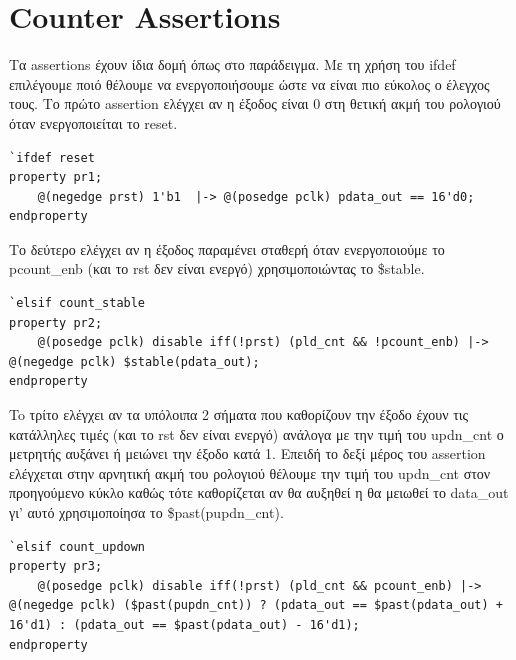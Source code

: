 \documentclass[12pt]{article}
\begin{document}
\section*{Counter Assertions}
Τα assertions έχουν ίδια δομή όπως στο παράδειγμα. Mε τη χρήση του ifdef επιλέγουμε ποιό θέλουμε να ενεργοποιήσουμε ώστε να είναι
πιο εύκολος ο έλεγχος τους. Το πρώτο assertion ελέγχει αν η έξοδος είναι 0 στη θετική ακμή του ρολογιού 
όταν ενεργοποιείται το reset.
\begin{verbatim} 
`ifdef reset
property pr1;
    @(negedge prst) 1'b1  |-> @(posedge pclk) pdata_out == 16'd0;
endproperty
\end{verbatim}
Το δεύτερο ελέγχει αν η έξοδος παραμένει σταθερή όταν ενεργοποιούμε το pcount\_enb (και το rst δεν είναι ενεργό) 
χρησιμοποιώντας το \$stable.
\begin{verbatim} 
`elsif count_stable
property pr2;
    @(posedge pclk) disable iff(!prst) (pld_cnt && !pcount_enb) |-> @(negedge pclk) $stable(pdata_out);
endproperty
\end{verbatim}
To τρίτο ελέγχει αν τα υπόλοιπα 2 σήματα που καθορίζουν την έξοδο έχουν τις κατάλληλες τιμές (και το rst δεν είναι ενεργό)
ανάλογα με την τιμή του updn\_cnt ο μετρητής αυξάνει ή μειώνει την έξοδο κατά 1. Επειδή το δεξί μέρος του assertion ελέγχεται
στην αρνητική ακμή του ρολογιού θέλουμε την τιμή του updn\_cnt στον προηγούμενο κύκλο καθώς τότε καθορίζεται αν θα αυξηθεί η θα μειωθεί
το data\_out γι' αυτό χρησιμοποίησα το \$past(pupdn\_cnt).
\begin{verbatim} 
`elsif count_updown                   
property pr3;
    @(posedge pclk) disable iff(!prst) (pld_cnt && pcount_enb) |-> @(negedge pclk) ($past(pupdn_cnt)) ? (pdata_out == $past(pdata_out) + 16'd1) : (pdata_out == $past(pdata_out) - 16'd1);
endproperty
\end{verbatim}
\end{document}
